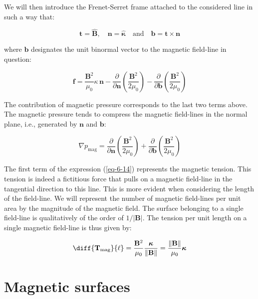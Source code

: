 We will then introduce the Frenet-Serret frame attached to the considered line in such a way that:

\begin{equation}
    \mathbf{t}=\mathbf{\hat{B}},\quad\mathbf{n}=\boldsymbol{\hat{\kappa}}\quad\text{and}\quad\mathbf{b}=\mathbf{t}\times\mathbf{n}
\end{equation}

where $\mathbf{b}$ designates the unit binormal vector to the magnetic field-line in question:

\begin{equation}
    \label{eq-6-14}
    \mathbf{f}=\frac{\mathbf{B}^2}{\mu_0}\kappa\,\mathbf{n}-\frac{\partial}{\partial\mathbf{n}}\left(\frac{\mathbf{B}^2}{2\mu_0}\right)-\frac{\partial}{\partial\mathbf{b}}\left(\frac{\mathbf{B}^2}{2\mu_0}\right)
\end{equation}

The contribution of magnetic pressure corresponds to the last two terms above. The magnetic pressure tends to compress the magnetic field-lines in the normal plane, i.e., generated by $\mathbf{n}$ and $\mathbf{b}$:

\begin{equation}
    \label{eq-5-15}
    \nabla p_\text{mag}=\frac{\partial}{\partial\mathbf{n}}\left(\frac{\mathbf{B}^2}{2\mu_0}\right)+\frac{\partial}{\partial\mathbf{b}}\left(\frac{\mathbf{B}^2}{2\mu_0}\right)
\end{equation}

The first term of the expression (\ref{eq-6-14}) represents the magnetic tension. This tension is indeed a fictitious force that pulls on a magnetic field-line in the tangential direction to this line. This is more evident when considering the length of the field-line. We will represent the number of magnetic field-lines per unit area by the magnitude of the magnetic field. The surface belonging to a single field-line is qualitatively of the order of $1/|\mathbf{B}|$. The tension per unit length on a single magnetic field-line is thus given by:

\begin{equation}
    \label{eq-5-16}
    \diff{\mathbf{T}_\text{mag}}{\ell}=\frac{\mathbf{B}^2}{\mu_0}\frac{\boldsymbol{\kappa}}{\|\mathbf{B}\|}=\frac{\|\mathbf{B}\|}{\mu_0}\boldsymbol{\kappa}
\end{equation}

\section{Magnetic surfaces}

